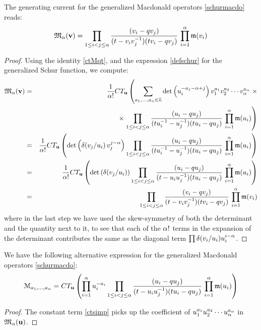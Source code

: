 \begin{thm}\label{Mofm}
The generating current for the generalized Macdonald operators \eqref{schurmacdo} reads:
\begin{equation}
{\mathfrak M}_{\alpha}({\mathbf v})=\prod_{1\leq i<j\leq {\alpha}} \frac{(v_i-q v_j)}{(t -v_i v_j^{-1})(t v_i-q  v_j)}
\, \prod_{i=1}^{\alpha} {\mathfrak m}(v_i)
\end{equation}
\end{thm}
\begin{proof}
Using the identity \eqref{ctMqt}, and the expression \eqref{defschur} for the generalized Schur function, we compute:
\begin{eqnarray*}
{\mathfrak M}_{\alpha}({\mathbf v})&=&\frac{1}{{\alpha}!}CT_{\mathbf u}\left(\sum_{a_1,...,a_{\alpha}\in {\mathbb Z}} \det\left( u_i^{-a_j-{\alpha}+j}\right)
v_1^{a_1}v_2^{a_2}\cdots v_{{\alpha}}^{a_{\alpha}} \right. \times \\
&&\qquad \qquad \qquad \times \left. \prod_{1\leq i<j\leq {\alpha}} \frac{(u_i-q u_j)}{(t u_i^{-1}-u_j^{-1})(t u_i-q u_j)}
\, \prod_{i=1}^{\alpha} {\mathfrak m}(u_i)\right)\\
&=&\frac{1}{{\alpha}!}CT_{\mathbf u}\left(\det\left( \delta(v_j/u_i)\, v_j^{j-{\alpha}}\right)
 \prod_{1\leq i<j\leq {\alpha}} \frac{(u_i-q u_j)}{(t u_i^{-1}-u_j^{-1})(t u_i-q  u_j)}
\, \prod_{i=1}^{\alpha} {\mathfrak m}(u_i)\right)\\
&=&\frac{1}{{\alpha}!}CT_{\mathbf u}\left(\det\left( \delta(v_j/u_i)\right)
 \prod_{1\leq i<j\leq {\alpha}} \frac{(u_i-q u_j)}{(t -u_i u_j^{-1})(t u_i-q u_j)}
\, \prod_{i=1}^{\alpha} {\mathfrak m}(u_i)\right)\\
&=&\prod_{1\leq i<j\leq {\alpha}} \frac{(v_i-q v_j)}{(t -v_i v_j^{-1})(t v_i-q v_j)}
\, \prod_{i=1}^{\alpha} {\mathfrak m}(v_i)
\end{eqnarray*}
where in the last step we have used the skew-symmetry of both the determinant and the quantity next to it, 
to see that each of the ${\alpha}!$ terms in the expansion of the determinant contributes the same as the diagonal 
term $\prod \delta(v_i/u_i) u_i^{i-{\alpha}}$.
\end{proof}


\begin{cor}\label{corCT}
We have the following alternative expression for the generalized Macdonald operators  \eqref{schurmacdo}:
\begin{equation}\label{ctsimp}
{\mathcal M}_{a_1,...,a_{\alpha}}=CT_{\mathbf u}\left(\prod_{i=1}^{\alpha} u_i^{-a_i}
 \prod_{1\leq i<j\leq {\alpha}} \frac{(u_i-q u_j)}{(t -u_i u_j^{-1})(t u_i-q u_j)}
\, \prod_{i=1}^{\alpha} {\mathfrak m}(u_i)\right)
\end{equation}
\end{cor}
\begin{proof}
The constant term \eqref{ctsimp} picks up the coefficient of 
$u_1^{a_1}u_2^{a_2}\cdots u_{\alpha}^{a_{\alpha}}$ in ${\mathfrak M}_{\alpha}({\mathbf u})$.
\end{proof}

